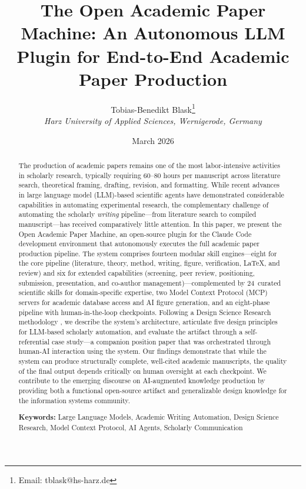 \documentclass{article}
\title{\textbf{The Open Academic Paper Machine: An Autonomous LLM Plugin for End-to-End Academic Paper Production}}
\author{
  Tobias-Benedikt Blask\thanks{Email: tblask@hs-harz.de} \\
  \textit{Harz University of Applied Sciences, Wernigerode, Germany}
}
\date{March 2026}
\begin{document}
\maketitle

\begin{abstract}
The production of academic papers remains one of the most labor-intensive activities in scholarly research, typically requiring 60--80 hours per manuscript across literature search, theoretical framing, drafting, revision, and formatting. While recent advances in large language model (LLM)-based scientific agents have demonstrated considerable capabilities in automating experimental research, the complementary challenge of automating the scholarly \emph{writing} pipeline---from literature search to compiled manuscript---has received comparatively little attention. In this paper, we present the Open Academic Paper Machine, an open-source plugin for the Claude Code development environment that autonomously executes the full academic paper production pipeline. The system comprises fourteen modular skill engines---eight for the core pipeline (literature, theory, method, writing, figure, verification, \LaTeX, and review) and six for extended capabilities (screening, peer review, positioning, submission, presentation, and co-author management)---complemented by 24~curated scientific skills for domain-specific expertise, two Model Context Protocol (MCP) servers for academic database access and AI figure generation, and an eight-phase pipeline with human-in-the-loop checkpoints. Following a Design Science Research methodology \citep{peffers2007dsrm}, we describe the system's architecture, articulate five design principles for LLM-based scholarly automation, and evaluate the artifact through a self-referential case study---a companion position paper \citep{blask2026creator} that was orchestrated through human-AI interaction using the system. Our findings demonstrate that while the system can produce structurally complete, well-cited academic manuscripts, the quality of the final output depends critically on human oversight at each checkpoint. We contribute to the emerging discourse on AI-augmented knowledge production by providing both a functional open-source artifact and generalizable design knowledge for the information systems community.

\medskip
\noindent\textbf{Keywords:} Large Language Models, Academic Writing Automation, Design Science Research, Model Context Protocol, AI Agents, Scholarly Communication
\end{abstract}
\end{document}
